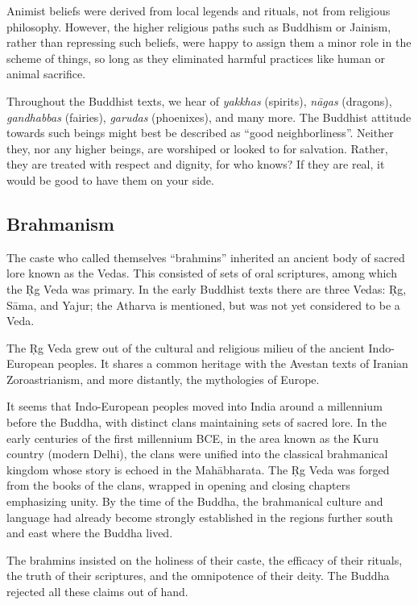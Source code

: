 \documentclass[12pt,openany]{book}%
\begin{document}
Animist beliefs were derived from local legends and rituals, not from religious philosophy. However, the higher religious paths such as Buddhism or Jainism, rather than repressing such beliefs, were happy to assign them a minor role in the scheme of things, so long as they eliminated harmful practices like human or animal sacrifice.

Throughout the Buddhist texts, we hear of \textit{yakkhas} (spirits), \textit{\textsanskrit{nāgas}} (dragons), \textit{gandhabbas} (fairies), \textit{garudas} (phoenixes), and many more. The Buddhist attitude towards such beings might best be described as “good neighborliness”. Neither they, nor any higher beings, are worshiped or looked to for salvation. Rather, they are treated with respect and dignity, for who knows? If they are real, it would be good to have them on your side.

\subsection*{Brahmanism}

The caste who called themselves “brahmins” inherited an ancient body of sacred lore known as the Vedas. This consisted of sets of oral scriptures, among which the Ṛg Veda was primary. In the early Buddhist texts there are three Vedas: Ṛg, \textsanskrit{Sāma}, and Yajur; the Atharva is mentioned, but was not yet considered to be a Veda.

The Ṛg Veda grew out of the cultural and religious milieu of the ancient Indo-European peoples. It shares a common heritage with the Avestan texts of Iranian Zoroastrianism, and more distantly, the mythologies of Europe.

It seems that Indo-European peoples moved into India around a millennium before the Buddha, with distinct clans maintaining sets of sacred lore. In the early centuries of the first millennium BCE, in the area known as the Kuru country (modern Delhi), the clans were unified into the classical brahmanical kingdom whose story is echoed in the \textsanskrit{Mahābharata}. The Ṛg Veda was forged from the books of the clans, wrapped in opening and closing chapters emphasizing unity. By the time of the Buddha, the brahmanical culture and language had already become strongly established in the regions further south and east where the Buddha lived.

The brahmins insisted on the holiness of their caste, the efficacy of their rituals, the truth of their scriptures, and the omnipotence of their deity. The Buddha rejected all these claims out of hand.
\end{document}

